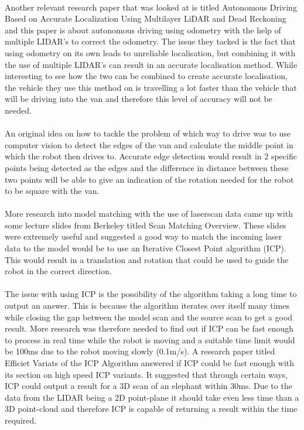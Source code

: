 \paragraph{}
Another relevant research paper that was looked at is titled Autonomous Driving Based on Accurate Localization Using Multilayer LiDAR and Dead Reckoning\cite{Akai} and this paper is about autonomous driving using odometry with the help of multiple LIDAR's to correct the odometry. The issue they tacked is the fact that using odometry on its own leads to unreliable localisation, but combining it with the use of multiple LIDAR's can result in an accurate localisation method. While interesting to see how the two can be combined to create accurate localisation, the vehicle they use this method on is travelling a lot faster than the vehicle that will be driving into the van and therefore this level of accuracy will not be needed.
\paragraph{}
An original idea on how to tackle the problem of which way to drive was to use computer vision to detect the edges of the van and calculate the middle point in which the robot then drives to. Accurate edge detection would result in 2 specific points being detected as the edges and the difference in distance between these two points will be able to give an indication of the rotation needed for the robot to be square with the van.
\paragraph{}
More research into model matching with the use of laserscan data came up with some lecture slides from Berkeley titled Scan Matching Overview\cite{Abbeel}. These slides were extremely useful and suggested a good way to match the incoming laser data to the model would be to use an Iterative Closest Point algorithm (ICP). This would result in a translation and rotation that could be used to guide the robot in the correct direction.
\paragraph{}
The issue with using ICP is the possibility of the algorithm taking a long time to output an answer. This is because the algorithm iterates over itself many times while closing the gap between the model scan and the source scan to get a good result. More research was therefore needed to find out if ICP can be fast enough to process in real time while the robot is moving and a suitable time limit would be 100ms due to the robot moving slowly (0.1m/s). A research paper titled Efficiet Variats of the ICP Algorithm\cite{Levoy} answered if ICP could be fast enough with its section on high speed ICP variants. It suggested that through certain ways, ICP could output a result for a 3D scan of an elephant within 30ms. Due to the data from the LIDAR being a 2D point-plane it should take even less time than a 3D point-cloud and therefore ICP is capable of returning a result within the time required.
